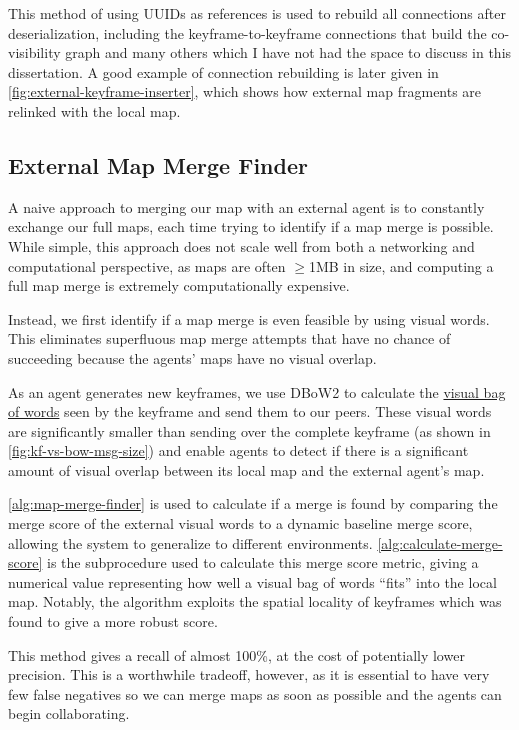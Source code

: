 This method of using UUIDs as references is used to rebuild all connections after deserialization, including the keyframe-to-keyframe connections that build the co-visibility graph and many others which I have not had the space to discuss in this dissertation. A good example of connection rebuilding is later given in \autoref{fig:external-keyframe-inserter}, which shows how external map fragments are relinked with the local map.

\subsection{External Map Merge Finder}
\label{sec:external-map-merge-finder}
A naive approach to merging our map with an external agent is to constantly exchange our full maps, each time trying to identify if a map merge is possible. While simple, this approach does not scale well from both a networking and computational perspective, as maps are often $\geq$1MB in size, and computing a full map merge is extremely computationally expensive.

Instead, we first identify if a map merge is even feasible by using visual words. This eliminates superfluous map merge attempts that have no chance of succeeding because the agents' maps have no visual overlap.

As an agent generates new keyframes, we use DBoW2 \autocite{GalvezTRO12} to calculate the \hyperref[sec:visual-bag-of-words]{visual bag of words} seen by the keyframe and send them to our peers. These visual words are significantly smaller than sending over the complete keyframe (as shown in \autoref{fig:kf-vs-bow-msg-size}) and enable agents to detect if there is a significant amount of visual overlap between its local map and the external agent's map.

\autoref{alg:map-merge-finder} is used to calculate if a merge is found by comparing the merge score of the external visual words to a dynamic baseline merge score, allowing the system to generalize to different environments. \autoref{alg:calculate-merge-score} is the subprocedure used to calculate this merge score metric, giving a numerical value representing how well a visual bag of words ``fits'' into the local map. Notably, the algorithm exploits the spatial locality of keyframes which was found to give a more robust score.

This method gives a recall of almost 100\%, at the cost of potentially lower precision. This is a worthwhile tradeoff, however, as it is essential to have very few false negatives so we can merge maps as soon as possible and the agents can begin collaborating.

